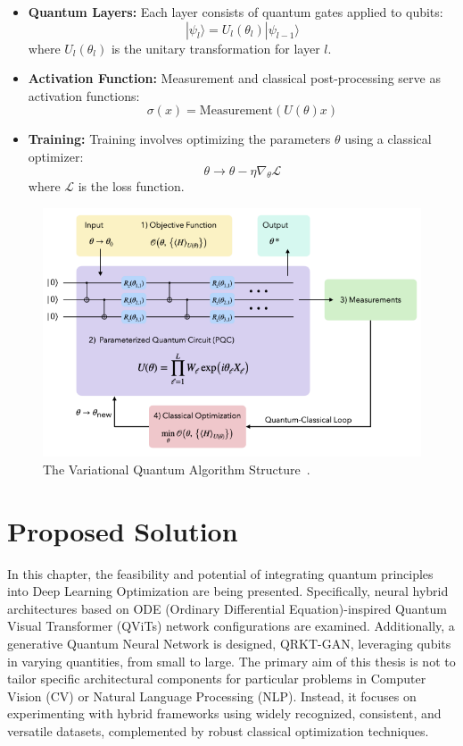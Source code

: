 \documentclass[12pt,a4paper]{report}
\begin{document}
\begin{itemize}
  \item \textbf{Quantum Layers:} Each layer consists of quantum gates applied to qubits:
        \[
          | \psi_l \rangle = U_l(\theta_l) | \psi_{l-1} \rangle
        \]
        where \(U_l(\theta_l)\) is the unitary transformation for layer \(l\).

  \item \textbf{Activation Function:} Measurement and classical post-processing serve as activation functions:
        \[
          \sigma(x) = \text{Measurement}(U(\theta)x)
        \]

  \item \textbf{Training:} Training involves optimizing the parameters \(\theta\) using a classical optimizer:
        \[
          \theta \rightarrow \theta - \eta \nabla_\theta \mathcal{L}
        \]
        where \(\mathcal{L}\) is the loss function.
\end{itemize}

\begin{figure}[th]
  \centering
  \includegraphics[scale=0.85]{./pics/vqa.png}
  \caption[The Variational Quantum Algorithm Structure]{The Variational Quantum Algorithm Structure~\cite{wang2024comprehensive}.}
  \label{fig:p10}
\end{figure}

\chapter{Proposed Solution}\vspace{-12pt}\label{solution}

In this chapter, the feasibility and potential of integrating quantum principles into Deep Learning Optimization are being presented. Specifically, neural hybrid architectures based on ODE (Ordinary Differential Equation)-inspired Quantum Visual Transformer (QViTs) network configurations are examined. Additionally, a generative Quantum Neural Network is designed, QRKT-GAN, leveraging qubits in varying quantities, from small to large. The primary aim of this thesis is not to tailor specific architectural components for particular problems in Computer Vision (CV) or Natural Language Processing (NLP). Instead, it focuses on experimenting with hybrid frameworks using widely recognized, consistent, and versatile datasets, complemented by robust classical optimization techniques.
\end{document}
